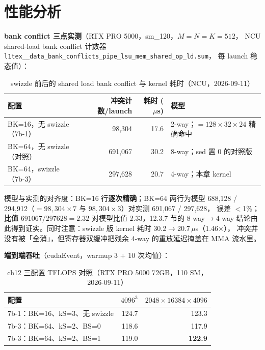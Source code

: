 
\section{性能分析}

\textbf{bank conflict 三点实测}（RTX PRO 5000，sm\_120，$M{=}N{=}K{=}512$，
NCU shared-load bank conflict 计数器
\texttt{l1tex\_\allowbreak{}\_\allowbreak{}data\_\allowbreak{}bank\_\allowbreak{}conflicts\_\allowbreak{}pipe\_\allowbreak{}lsu\_\allowbreak{}mem\_\allowbreak{}\allowbreak{}shared\_\allowbreak{}op\_\allowbreak{}ld.sum}，
每 launch 稳态值）：

\begin{table}[htbp]
\centering
\caption{swizzle 前后的 shared load bank conflict 与 kernel 耗时（NCU，2026-09-11）}
\label{tab:12-bank}
\begin{tabular}{lrrl}
\toprule
配置 & 冲突计数/launch & 耗时 ($\mu$s) & 模型 \\
\midrule
BK=16，无 swizzle（7b-1） & 98{,}304 & 17.6 & 2-way；$=128{\times}32{\times}24$ 精确命中 \\
BK=64，无 swizzle（对照） & 691{,}067 & 30.2 & 8-way；sed 置 0 的对照版 \\
BK=64，swizzle（7b-3）    & 297{,}628 & 20.7 & 4-way；本章 kernel \\
\bottomrule
\end{tabular}
\end{table}

模型与实测的对齐度：BK=16 行\textbf{逐次精确}；BK=64 两行为模型 688{,}128 /
294{,}912（$=98{,}304\times7$ 与 $98{,}304\times3$）对实测 691{,}067 / 297{,}628，
误差 $<$1\%；\textbf{比值} $691067/297628=2.32$ 对模型比值 $2.33$，12.3.7 节的 8-way$\to$4-way
结论由此得到证实。同时注意：swizzle 版 kernel 耗时 30.2$\to$20.7\,$\mu$s（1.46$\times$），
冲突并没有被「全消」，但寄存器双缓冲把残余 4-way 的重放延迟掩盖在 MMA 流水里。

\textbf{端到端吞吐}（cudaEvent，warmup 3 + 10 次均值）：

\begin{table}[htbp]
\centering
\caption{ch12 三配置 TFLOPS 对照（RTX PRO 5000 72GB，110 SM，2026-09-11）}
\label{tab:12-tflops}
\begin{tabular}{lrr}
\toprule
配置 & $4096^3$ & $2048\times16384\times4096$ \\
\midrule
7b-1：BK=16、kS=3、无 swizzle       & 124.7 & 123.3 \\
7b-3：BK=64、kS=2、BS=0             & 118.6 & 117.9 \\
7b-3：BK=64、kS=2、BS=1             & 119.0 & \textbf{122.9} \\
\bottomrule
\end{tabular}
\end{table}


